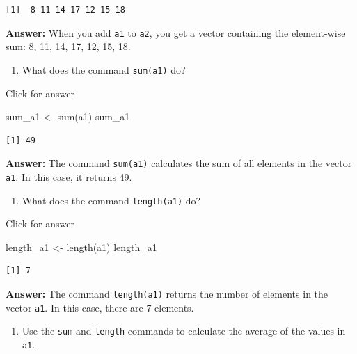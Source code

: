 \documentclass[
]{book}
\newenvironment{Shaded}{\begin{snugshade}}{\end{snugshade}}
\newcommand{\FunctionTok}[1]{\textcolor[rgb]{0.00,0.00,0.00}{#1}}
\newcommand{\NormalTok}[1]{#1}
\newcommand{\OtherTok}[1]{\textcolor[rgb]{0.56,0.35,0.01}{#1}}
\providecommand{\tightlist}{%
  \setlength{\itemsep}{0pt}\setlength{\parskip}{0pt}}
\begin{document}
\begin{verbatim}
[1]  8 11 14 17 12 15 18
\end{verbatim}

\textbf{Answer:} When you add \texttt{a1} to \texttt{a2}, you get a vector containing the element-wise sum: 8, 11, 14, 17, 12, 15, 18.

\begin{enumerate}
\def\labelenumi{\alph{enumi}.}
\setcounter{enumi}{3}
\tightlist
\item
  What does the command \texttt{sum(a1)} do?
\end{enumerate}

Click for answer

\begin{Shaded}
\begin{Highlighting}[]
\NormalTok{sum\_a1 }\OtherTok{\textless{}{-}} \FunctionTok{sum}\NormalTok{(a1)}
\NormalTok{sum\_a1}
\end{Highlighting}
\end{Shaded}

\begin{verbatim}
[1] 49
\end{verbatim}

\textbf{Answer:} The command \texttt{sum(a1)} calculates the sum of all elements in the vector \texttt{a1}. In this case, it returns 49.

\begin{enumerate}
\def\labelenumi{\alph{enumi}.}
\setcounter{enumi}{4}
\tightlist
\item
  What does the command \texttt{length(a1)} do?
\end{enumerate}

Click for answer

\begin{Shaded}
\begin{Highlighting}[]
\NormalTok{length\_a1 }\OtherTok{\textless{}{-}} \FunctionTok{length}\NormalTok{(a1)}
\NormalTok{length\_a1}
\end{Highlighting}
\end{Shaded}

\begin{verbatim}
[1] 7
\end{verbatim}

\textbf{Answer:} The command \texttt{length(a1)} returns the number of elements in the vector \texttt{a1}. In this case, there are 7 elements.

\begin{enumerate}
\def\labelenumi{\alph{enumi}.}
\setcounter{enumi}{5}
\tightlist
\item
  Use the \texttt{sum} and \texttt{length} commands to calculate the average of the values in \texttt{a1}.
\end{enumerate}
\end{document}
